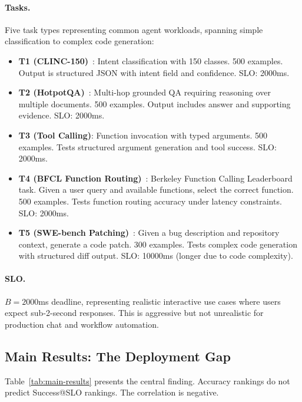 \documentclass[11pt]{article}
\begin{document}
\paragraph{Tasks.}
Five task types representing common agent workloads, spanning simple classification to complex code generation:
\begin{itemize}[leftmargin=12pt]
    \item \textbf{T1 (CLINC-150)}~\citep{larson2019clinc150}: Intent classification with 150 classes. 500 examples. Output is structured JSON with intent field and confidence. SLO: 2000ms.
    \item \textbf{T2 (HotpotQA)}~\citep{yang2018hotpotqa}: Multi-hop grounded QA requiring reasoning over multiple documents. 500 examples. Output includes answer and supporting evidence. SLO: 2000ms.
    \item \textbf{T3 (Tool Calling)}: Function invocation with typed arguments. 500 examples. Tests structured argument generation and tool success. SLO: 2000ms.
    \item \textbf{T4 (BFCL Function Routing)}~\citep{berkeley2024bfcl}: Berkeley Function Calling Leaderboard task. Given a user query and available functions, select the correct function. 500 examples. Tests function routing accuracy under latency constraints. SLO: 2000ms.
    \item \textbf{T5 (SWE-bench Patching)}~\citep{princeton2024swe}: Given a bug description and repository context, generate a code patch. 300 examples. Tests complex code generation with structured diff output. SLO: 10000ms (longer due to code complexity).
\end{itemize}

\paragraph{SLO.}
$B = 2000$ms deadline, representing realistic interactive use cases where users expect sub-2-second responses.
This is aggressive but not unrealistic for production chat and workflow automation.

\subsection{Main Results: The Deployment Gap}

Table~\ref{tab:main-results} presents the central finding.
Accuracy rankings do not predict Success@SLO rankings.
The correlation is negative.
\end{document}

